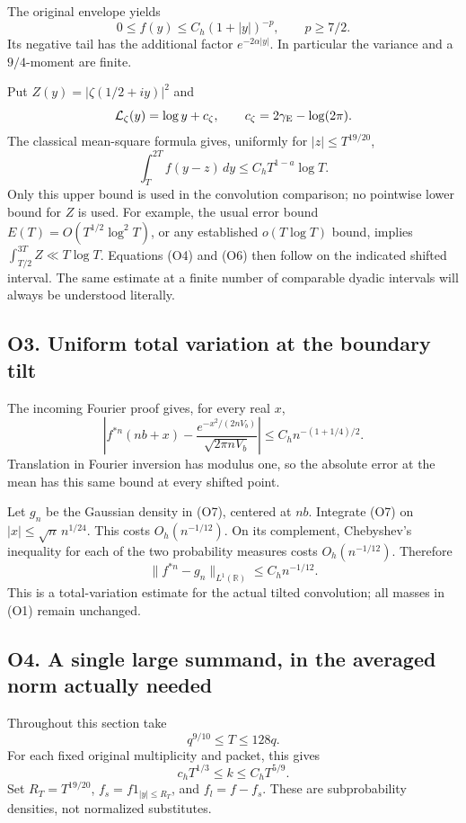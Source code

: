 \documentclass[11pt,a4paper]{article}
\begin{document}
The original envelope yields \[
0\le f(y)\le C_h(1+|y|)^{-p},\qquad p\ge7/2.
\tag{O5}
\] Its negative tail has the additional factor \(e^{-2\alpha|y|}\). In
particular the variance and a \(9/4\)-moment are finite.

Put \(Z(y)=|\zeta(1/2+iy)|^2\) and \[
\mathcal L_\zeta(y)=\log y+c_\zeta,\qquad
c_\zeta=2\gamma_{\rm E}-\log(2\pi).
\] The classical mean-square formula gives, uniformly for
\(|z|\le T^{19/20}\), \[
\int_T^{2T}f(y-z)\,dy\le C_h T^{1-a}\log T.\tag{O6}
\] Only this upper bound is used in the convolution comparison; no
pointwise lower bound for \(Z\) is used. For example, the usual error
bound \(E(T)=O(T^{1/2}\log^2T)\), or any established \(o(T\log T)\)
bound, implies \(\int_{T/2}^{3T}Z\ll T\log T\). Equations (O4) and (O6)
then follow on the indicated shifted interval. The same estimate at a
finite number of comparable dyadic intervals will always be understood
literally.

\subsection{O3. Uniform total variation at the boundary
tilt}\label{sa:o3.-uniform-total-variation-at-the-boundary-tilt}

The incoming Fourier proof gives, for every real \(x\), \[
\left|f^{*n}(nb+x)-
\frac{e^{-x^2/(2nV_b)}}{\sqrt{2\pi nV_b}}\right|
\le C_h n^{-(1+1/4)/2}.\tag{O7}
\] Translation in Fourier inversion has modulus one, so the absolute
error at the mean has this same bound at every shifted point.

Let \(g_n\) be the Gaussian density in (O7), centered at \(nb\).
Integrate (O7) on \(|x|\le\sqrt n\,n^{1/24}\). This costs
\(O_h(n^{-1/12})\). On its complement, Chebyshev's inequality for each
of the two probability measures costs \(O_h(n^{-1/12})\). Therefore \[
\boxed{\|f^{*n}-g_n\|_{L^1(\mathbb R)}\le C_h n^{-1/12}.}\tag{O8}
\] This is a total-variation estimate for the actual tilted convolution;
all masses in (O1) remain unchanged.

\subsection{O4. A single large summand, in the averaged norm actually
needed}\label{sa:o4.-a-single-large-summand-in-the-averaged-norm-actually-needed}

Throughout this section take \[
q^{9/10}\le T\le128q.
\] For each fixed original multiplicity and packet, this gives \[
c_hT^{1/3}\le k\le C_hT^{5/9}.\tag{O9}
\] Set \(R_T=T^{19/20}\), \(f_s=f1_{|y|\le R_T}\), and \(f_l=f-f_s\).
These are subprobability densities, not normalized substitutes.
\end{document}
